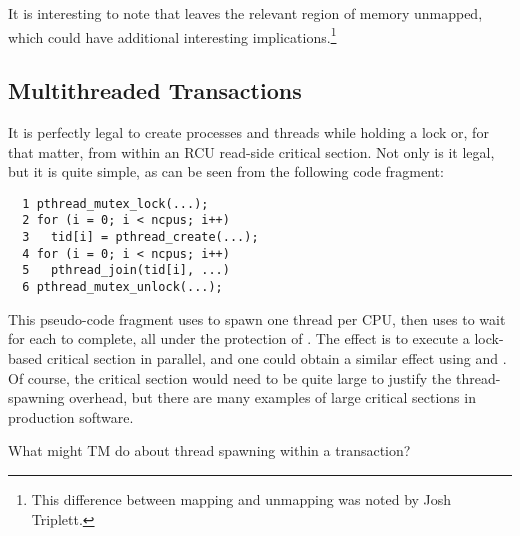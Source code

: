 It is interesting to note that  leaves the relevant region
of memory unmapped, which could have additional interesting
implications.\footnote{
	This difference between mapping and unmapping was noted by
	Josh Triplett.}

\subsection{Multithreaded Transactions}
\label{sec:future:Multithreaded Transactions}

It is perfectly legal to create processes and threads while holding
a lock or, for that matter, from within an RCU read-side critical
section.
Not only is it legal, but it is quite simple, as can be seen from the
following code fragment:

\vspace{5pt}
\begin{minipage}[t]{\columnwidth}
\small
\begin{verbatim}
  1 pthread_mutex_lock(...);
  2 for (i = 0; i < ncpus; i++)
  3   tid[i] = pthread_create(...);
  4 for (i = 0; i < ncpus; i++)
  5   pthread_join(tid[i], ...)
  6 pthread_mutex_unlock(...);
\end{verbatim}
\end{minipage}
\vspace{5pt}

This pseudo-code fragment uses  to spawn one thread
per CPU, then uses  to wait for each to complete,
all under the protection of .
The effect is to execute a lock-based critical section in parallel,
and one could obtain a similar effect using  and .
Of course, the critical section would need to be quite large to justify
the thread-spawning overhead, but there are many examples of large
critical sections in production software.

What might TM do about thread spawning within a transaction?

